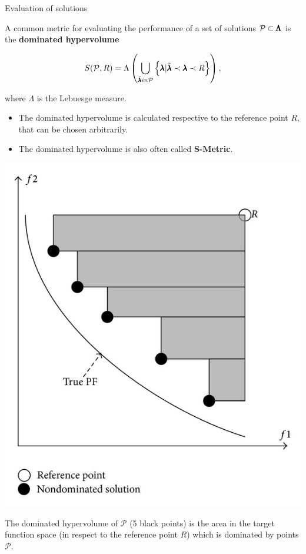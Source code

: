 \begin{frame}[allowframebreaks]{Evaluation of solutions}

A common metric for evaluating the performance of a set of solutions $\mathcal{P} \subset \pmb{\Lambda}$ is the \textbf{dominated hypervolume}

$$
    S(\mathcal{P}, R) = \Lambda\left(\bigcup_{\tilde{\pmb{\lambda}} in \mathcal{P}}\left\{\pmb{\lambda} | \tilde{\pmb{\lambda}} \prec \pmb{\lambda} \prec R\right\}\right),
$$

where $\Lambda$ is the Lebuesge measure.
    \vspace{1cm}
    \begin{itemize}
            \item The dominated hypervolume is calculated respective to the reference point $R$, that can be chosen arbitrarily.
            \item The dominated hypervolume is also often called \textbf{S-Metric}.
    \end{itemize}

\framebreak

\begin{center}
\includegraphics[width = 0.3\linewidth]{images/dominated_hypervolume.png}
\end{center}

The dominated hypervolume of $\mathcal{P}$ (5 black points) is the area in the target function space (in respect to the reference point $R$) which is dominated by points $\mathcal{P}$.

\framebreak



\end{frame}



